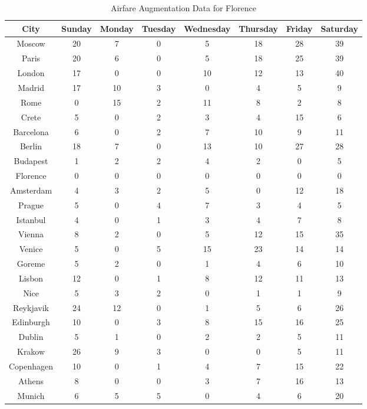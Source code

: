 \documentclass[12pt]{article}
\begin{document}
\pagebreak
\begin{table}[h]
\caption{Airfare Augmentation Data for Florence}
\centering
\vspace{1mm}
\begin{tabular}{c|c|c|c|c|c|c|c}
\hline
\rule{0pt}{2ex} City & Sunday & Monday & Tuesday & Wednesday & Thursday & Friday & Saturday \\
\hline
\rule{0pt}{2ex}Moscow & 20 & 7 & 0 & 5 & 18 & 28 & 39 \\
Paris & 20 & 6 & 0 & 5 & 18 & 25 & 39 \\
London & 17 & 0 & 0 & 10 & 12 & 13 & 40 \\
Madrid & 17 & 10 & 3 & 0 & 4 & 5 & 9 \\
Rome & 0 & 15 & 2 & 11 & 8 & 2 & 8 \\
Crete & 5 & 0 & 2 & 3 & 4 & 15 & 6 \\
Barcelona & 6 & 0 & 2 & 7 & 10 & 9 & 11 \\
Berlin & 18 & 7 & 0 & 13 & 10 & 27 & 28 \\
Budapest & 1 & 2 & 2 & 4 & 2 & 0 & 5 \\
Florence & 0 & 0 & 0 & 0 & 0 & 0 & 0 \\
Amsterdam & 4 & 3 & 2 & 5 & 0 & 12 & 18 \\
Prague & 5 & 0 & 4 & 7 & 3 & 4 & 5 \\
Istanbul & 4 & 0 & 1 & 3 & 4 & 7 & 8 \\
Vienna & 8 & 2 & 0 & 5 & 12 & 15 & 35 \\
Venice & 5 & 0 & 5 & 15 & 23 & 14 & 14 \\
Goreme & 5 & 2 & 0 & 1 & 4 & 6 & 10 \\
Lisbon & 12 & 0 & 1 & 8 & 12 & 11 & 13 \\
Nice & 5 & 3 & 2 & 0 & 1 & 1 & 9 \\
Reykjavik & 24 & 12 & 0 & 1 & 5 & 6 & 26 \\
Edinburgh & 10 & 0 & 3 & 8 & 15 & 16 & 25 \\
Dublin & 5 & 1 & 0 & 2 & 2 & 5 & 11 \\
Krakow & 26 & 9 & 3 & 0 & 0 & 5 & 11 \\
Copenhagen & 10 & 0 & 1 & 4 & 7 & 15 & 22 \\
Athens & 8 & 0 & 0 & 3 & 7 & 16 & 13 \\
Munich & 6 & 5 & 5 & 0 & 4 & 6 & 20 \\

\end{tabular}
\end{table}
\end{document}
